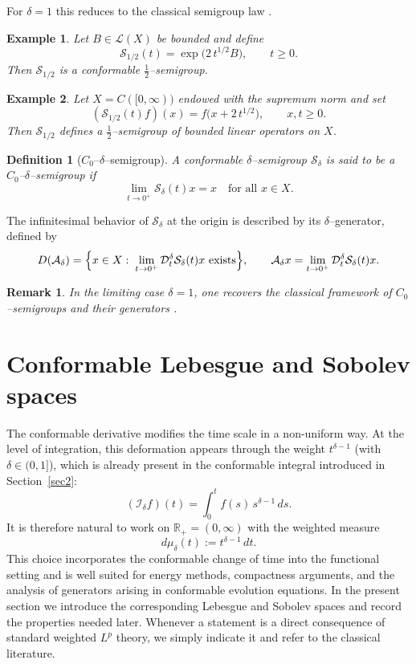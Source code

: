 \documentclass[preprint,12pt]{elsarticle}
\newtheorem{definition}{Definition}
\newtheorem{example}{Example}
\newtheorem{remark}{Remark}
\newcommand{\R}{\mathbb {R}}
\begin{document}
For $\delta=1$ this reduces to the classical semigroup law
\cite{pazy1983,engel2000}.

\begin{example}
Let $B\in\mathcal{L}(X)$ be bounded and define
\[
\mathcal{S}_{1/2}(t)=\exp\!\bigl(2\,t^{1/2}B\bigr),\qquad t\ge0.
\]
Then $\mathcal{S}_{1/2}$ is a conformable $\tfrac12$--semigroup.
\end{example}

\begin{example}
Let $X=C([0,\infty))$ endowed with the supremum norm and set
\[
(\mathcal{S}_{1/2}(t)f)(x)=f\bigl(x+2\,t^{1/2}\bigr),
\qquad x,t\ge0.
\]
Then $\mathcal{S}_{1/2}$ defines a $\tfrac12$--semigroup of bounded linear
operators on $X$.
\end{example}

\begin{definition}[$C_0$--$\delta$--semigroup]
A conformable $\delta$--semigroup $\mathcal{S}_\delta$ is said to be a
\emph{$C_0$--$\delta$--semigroup} if
\[
\lim_{t\to0^+}\mathcal{S}_\delta(t)x=x
\quad\text{for all }x\in X.
\]
\end{definition}

The infinitesimal behavior of $\mathcal{S}_\delta$ at the origin is described by
its $\delta$--generator, defined by
\[
D(\mathcal{A}_\delta)
=
\Bigl\{
x\in X:\;
\lim_{t\to0^+}\mathcal{D}_t^\delta\mathcal{S}_\delta(t)x
\ \text{exists}
\Bigr\},
\qquad
\mathcal{A}_\delta x
=
\lim_{t\to0^+}\mathcal{D}_t^\delta\mathcal{S}_\delta(t)x.
\]

\begin{remark}
In the limiting case $\delta=1$, one recovers the classical framework of
$C_0$--semigroups and their generators \cite{pazy1983,engel2000}.
\end{remark}


\section{Conformable Lebesgue and Sobolev spaces}\label{sec3}

The conformable derivative modifies the time scale in a non-uniform way.
At the level of integration, this deformation appears through the weight
$t^{\delta-1}$ (with $\delta\in(0,1]$), which is already present in the
conformable integral introduced in Section~\ref{sec2}:
\[
(\mathcal I_\delta f)(t)=\int_0^t f(s)\,s^{\delta-1}\,ds.
\]
It is therefore natural to work on $\R_+=(0,\infty)$ with the weighted measure
\[
d\mu_\delta(t):=t^{\delta-1}\,dt.
\]
This choice incorporates the conformable change of time into the functional
setting and is well suited for energy methods, compactness arguments, and the
analysis of generators arising in conformable evolution equations.
In the present section we introduce the corresponding Lebesgue and Sobolev
spaces and record the properties needed later.
Whenever a statement is a direct consequence of standard weighted $L^p$ theory,
we simply indicate it and refer to the classical literature.
\end{document}
